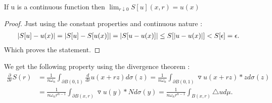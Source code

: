 \begin{lemma}
  If u is a continuous function then $\lim_{r \downarrow 0 } S[u](x,r) = u(x)$ 
\end{lemma}
\begin{proof}[Proof]
  Just using the constant properties and continuous nature : 
  \begin{align*}
    \lvert S[u] - u(x)\rvert = \lvert S[u]-S[u(x)]\rvert = \lvert S[u-u(x)]\rvert \le S[\lvert u-u(x)\rvert] < S[\epsilon ] = \epsilon 
  .\end{align*}
  Which proves the statement.
\end{proof}
We get the following property using the divergence theorem : 
\begin{align*}
  \frac{\partial }{\partial r} S(r) &= \frac{1}{n \omega_n} \int_{\partial B(0,1)} \frac{d}{dr} u(x+rz) d\sigma(z) = \frac{1}{n \omega_n} \int_{\partial B(0,1)} \triangledown u (x+rz)*z d\sigma(z) \\ 
                                    &= \frac{1}{n \omega_n r^{n-1 } } \int_{\partial B(x,r)} \triangledown u(y) * N d\sigma(y) = \frac{1}{n \omega_n r^{n-1 } }\int_{B(x,r)} \triangle u d\mu 
.\end{align*}
